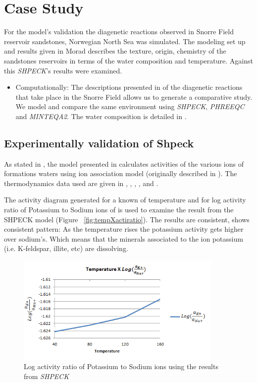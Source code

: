 \section{Case Study}
For the model’s validation the diagenetic reactions observed in Snorre Field reservoir sandstones, Norwegian North Sea was simulated. The modeling set up and results given in Morad \cite{Morad:90} describes the texture, origin, chemistry of the sandstones reservoirs in terms of the water composition and temperature. Against this \emph{SHPECK}'s results were examined.
\begin{itemize}
\item Computationally: The descriptions presented in \cite{Morad:90} of the diagenetic reactions that take place in the Snorre Field allows us to generate a comparative study. We model and compare the same environment using \emph{SHPECK}, \emph{PHREEQC} and \emph{MINTEQA2}. The water composition is detailed in \cite{Nordstrom:79}.
\end{itemize}


\subsection{Experimentally validation of Shpeck}
As stated in \cite{Morad:90}, the model presented in \cite{Egeberg:88} calculates activities of the various ions of formations waters using ion association model (originally described in \cite{Wigley:77}). 
The thermodynamics data used are given in \cite{Helgeson:74a},  \cite{Helgeson:74b}, \cite{Helgeson:76}, \cite{Waltter:77}, \cite{Helgeson:78} and \cite{Helgeson:81}.

The activity diagram generated for a known of temperature and for log activity ratio of Potassium to Sodium ions of \cite{Aagaard:90} is used to examine the result from the SHPECK model (Figure ~\ref{fig:tempXactiratio}). The results are consistent, shows consistent pattern: As the temperature rises the potassium activity gets higher over sodium's. Which means that the minerals associated to the ion potassium (i.e. K-feldspar, illite, etc) are dissolving.


\begin{figure}[ht!]
\centering
\includegraphics[width=100mm]{figures/tempXactratio.png}
\caption{Log activity ratio of Potassium to Sodium ions using the results from \emph{SHPECK}}
\label{fig:tempXactratio}
\end{figure}

